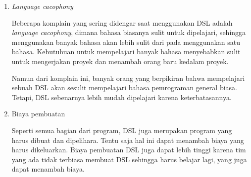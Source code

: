 \begin{enumerate}
    \item \textit{Language cacophony}
    
    Beberapa komplain yang sering didengar saat menggunakan DSL adalah \textit{language cacophony},
    dimana bahasa biasanya sulit untuk dipelajari, sehingga menggunakan banyak bahasa akan lebih
    sulit dari pada menggunakan satu bahasa. Kebutuhuan untuk mempelajari banyak bahasa menyebabkan
    sulit untuk mengerjakan proyek dan menambah orang baru kedalam proyek.

    Namun dari komplain ini, banyak orang yang berpikiran bahwa mempelajari sebuah DSL akan sesulit
    mempelajari bahasa pemrograman general biasa. Tetapi, DSL sebenarnya lebih mudah dipelajari
    karena keterbatasannya.

    \item Biaya pembuatan
    
    Seperti semua bagian dari program, DSL juga merupakan program yang harus dibuat dan dipelihara.
    Tentu saja hal ini dapat menambah biaya yang harus dikeluarkan. Biaya pembuatan DSL juga dapat
    lebih tinggi karena tim yang ada tidak terbiasa membuat DSL sehingga harus belajar lagi, yang
    juga dapat menambah biaya.

\end{enumerate}